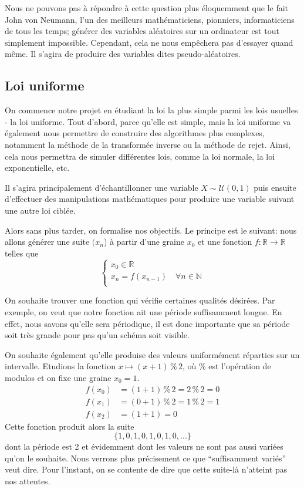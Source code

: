 \documentclass[10pt]{article} %
\begin{document}
Nous ne pouvons pas à répondre à cette question plus éloquemment que le fait John von Neumann, l'un des meilleurs mathématiciens, pionniers, informaticiens de tous les temps; générer des variables aléatoires sur un ordinateur est tout simplement impossible.
Cependant, cela ne nous empêchera pas d'essayer quand même. Il s'agira de produire des variables dites pseudo-aléatoires.

\subsection{Loi uniforme}

On commence notre projet en étudiant la loi la plus simple parmi les lois usuelles - la loi uniforme. Tout d'abord, parce qu'elle est simple, mais la loi uniforme va également nous permettre de construire des algorithmes plus complexes, notamment la méthode de la transformée inverse ou la méthode de rejet. Ainsi, cela nous permettra de simuler différentes lois, comme la loi normale, la loi exponentielle, etc.

Il s'agira principalement d'échantillonner une variable $X\sim \mathcal{U}(0, 1)$ puis ensuite d'effectuer des manipulations mathématiques pour produire une variable suivant une autre loi ciblée.

Alors sans plus tarder, on formalise nos objectifs. Le principe est le suivant: nous allons générer une suite $(x_n$) à partir d'une graine $x_0$ et une fonction $f : \mathbb{R} \longrightarrow \mathbb{R}$ telles que
$$
\left\{
    \begin{array}{ll}
        x_{0} \in \mathbb{R} \\
        x_{n} = f(x_{n - 1})  \quad \forall n \in \mathbb{N} \\
    \end{array}
\right.
$$

On souhaite trouver une fonction qui vérifie certaines qualités désirées. Par exemple, on veut que notre fonction ait une période suffisamment longue. En effet, nous savons qu'elle sera périodique, il est donc importante que sa période soit très grande pour pas qu'un schéma soit visible.

On souhaite également qu'elle
produise des valeurs uniformément réparties sur un intervalle. Etudions la fonction $x \mapsto (x + 1) \mathbin{\%} 2$, où \% est l'opération de modulos et on fixe une graine $x_0 = 1$.
\begin{align*}
    f(x_0) &= (1 + 1) \mathbin{\%} 2 = 2 \mathbin{\%} 2 = 0 \\
    f(x_1) &= (0 + 1) \mathbin{\%} 2 = 1 \mathbin{\%} 2 = 1 \\
    f(x_2) &= (1 + 1) = 0
\end{align*}
Cette fonction produit alors la suite
\begin{equation*}
    \{1, 0, 1, 0, 1, 0, 1, 0, ...\}
\end{equation*}
dont la période est 2 et évidemment dont les valeurs ne sont pas aussi variées qu'on le souhaite. Nous verrons plus précisement ce que
``suffisamment variés'' veut dire. Pour l'instant, on se contente de dire que cette suite-là n'atteint pas nos attentes.
\end{document}
